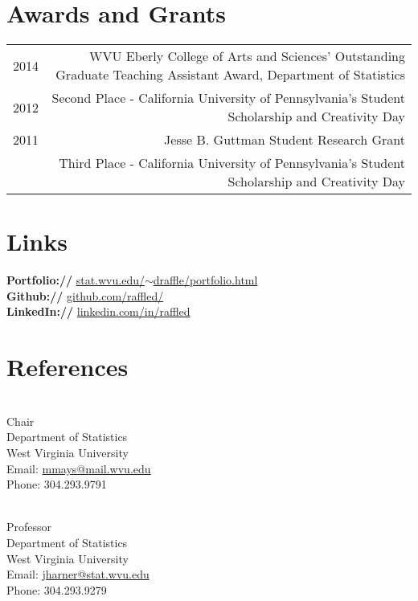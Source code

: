 \documentclass[letterpaper]{deedy-resume} %
\begin{document}
\section{Awards and Grants}
\begin{longtable}{r| R}
2014 & WVU Eberly College of Arts and Sciences' Outstanding Graduate
       Teaching Assistant Award, Department of Statistics\vspace{5pt}\\
2012 & Second Place - California University of
       Pennsylvania's Student Scholarship and Creativity Day\vspace{5pt}\\
2011 & Jesse B. Guttman Student Research Grant\vspace{5pt}\\
     & Third Place - California University of Pennsylvania's
       Student Scholarship and Creativity Day\\
\end{longtable}

\section{Links}
{\bf Portfolio://} \href{http://stat.wvu.edu/~draffle/portfolio.html}{stat.wvu.edu/$\sim$draffle/portfolio.html}\\
{\bf Github://} \href{http://github.com/raffled/}{github.com/raffled/}\\
{\bf LinkedIn://} \href{https://www.linkedin.com/in/raffled}{linkedin.com/in/raffled} \\

\sectionspace

\section{References}
\\
Chair\\
Department of Statistics\\
West Virginia University\\
Email: \href{mailto:mmays@mail.wvu.edu}{mmays@mail.wvu.edu}\\
Phone: 304.293.9791\\

\vspace{10pt}

\\
Professor\\
Department of Statistics\\
West Virginia University\\
Email: \href{mailto:jharner@stat.wvu.edu}{jharner@stat.wvu.edu}\\
Phone: 304.293.9279\\
\end{document}
